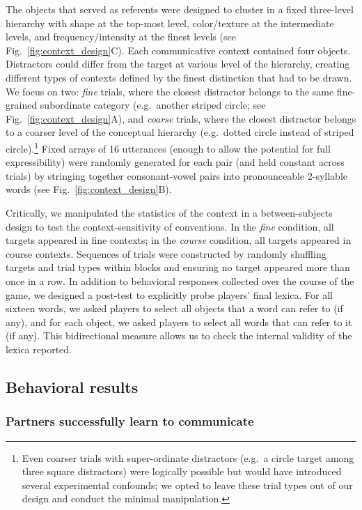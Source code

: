The objects that served as referents were designed to cluster in a fixed three-level hierarchy with shape at the top-most level, color/texture at the intermediate levels, and frequency/intensity at the finest levels (see Fig.\ \ref{fig:context_design}C). Each communicative context contained four objects. Distractors could differ from the target at various level of the hierarchy, creating different types of contexts defined by the finest distinction that had to be drawn. We focus on two: \emph{fine} trials, where the closest distractor belongs to the same fine-grained subordinate category (e.g.\ another striped circle; see Fig.\ \ref{fig:context_design}A), and \emph{coarse} trials, where the closest distractor belongs to a coarser level of the conceptual hierarchy (e.g.\ dotted circle instead of striped circle).\footnote{Even coarser trials with super-ordinate distractors (e.g.\ a circle target among three square distractors) were logically possible but would have introduced several experimental confounds; we opted to leave these trial types out of our design and conduct the minimal manipulation.} Fixed arrays of 16 utterances (enough to allow the potential for full expressibility) were randomly generated for each pair (and held constant across trials) by stringing together consonant-vowel pairs into pronounceable 2-syllable words (see Fig.\ \ref{fig:context_design}B).

Critically, we manipulated the statistics of the context in a between-subjects design to test the context-sensitivity of conventions. 
In the \emph{fine} condition, all targets appeared in fine contexts; in the \emph{course} condition, all targets appeared in course contexts.
Sequences of trials were constructed by randomly shuffling targets and trial types within blocks and ensuring no target appeared more than once in a row. 
In addition to behavioral responses collected over the course of the game, we designed a post-test to explicitly probe players' final lexica. For all sixteen words, we asked players to select all objects that a word can refer to (if any), and for each object, we asked players to select all words that can refer to it (if any). 
This bidirectional measure allows us to check the internal validity of the lexica reported.

\subsection{Behavioral results}

\subsubsection{Partners successfully learn to communicate}


